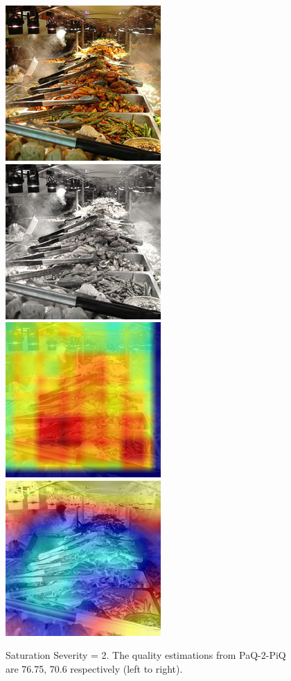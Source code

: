 \documentclass[10pt,twocolumn,letterpaper]{article}
\begin{document}
\begin{figure}[!ht]
	\includegraphics[width=.49\columnwidth]{Images/test_images/severity=0/buffet.png}\hfill
	\includegraphics[width=.49\columnwidth]{Images/test_images/severity=2/saturate/buffet.png}\hfill
	\\[\smallskipamount]
    \includegraphics[width=.49\columnwidth]{Images/saliency_maps/paq2piq/severity=2/saturate/buffet.png}\hfill
	\includegraphics[width=.49\columnwidth]{Images/saliency_maps/resnet18/severity=2/saturate/buffet.png}\hfill
	\caption{Saturation Severity = 2. The quality estimations from PaQ-2-PiQ are 76.75, 70.6 respectively (left to right).}
\end{figure}
\end{document}
